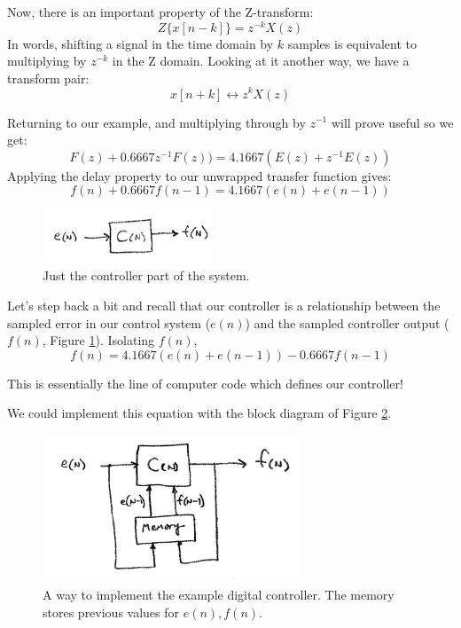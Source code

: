 
Now, there is an important property of the Z-transform:	%
\[
Z\{x[n-k]\} = z^{-k}X(z)
\]
 In  words, shifting a signal in the time domain by $k$ samples is equivalent to multiplying by $z^{-k}$ in the Z domain.   Looking at it another way, we have a transform pair:	%
\[
x[n+k] \leftrightarrow z^{k}X(z)
\]

Returning to our example, and	%
multiplying through by $z^{-1}$ will prove useful so we get:
\[
F(z)+0.6667z^{-1}F(z)) = 4.1667 ( E(z) + z^{-1}E(z))
\]
Applying the delay property  to our unwrapped transfer function  gives:	%
\[
f(n)+0.6667f(n-1) = 4.1667 (e(n) + e(n-1))
\]

\begin{figure}\centering
\includegraphics[width=2.0in]{figs11/dt_ctlra.png}
\caption{Just the controller part of the system.}\label{F:dt_ctl}
\end{figure}

Let's step back a bit and recall that our controller is a relationship between the sampled error in our control system ($e(n)$) and the sampled controller output ($f(n)$, Figure \ref{F:dt_ctl}).  Isolating $f(n)$,	%
\[
f(n) = 4.1667 (e(n) + e(n-1))-0.6667f(n-1)
\]

This is essentially the line of computer code which defines our controller!  	%


 We could implement this equation with the block diagram of Figure \ref{F:DigitalControl}.	%

\begin{figure}\centering
\includegraphics[width=3.0in]{figs11/dig_ctl_bda.png}
\caption{A way to implement the example digital controller.  The memory stores previous values for $e(n), f(n)$. }\label{F:DigitalControl}
\end{figure}


